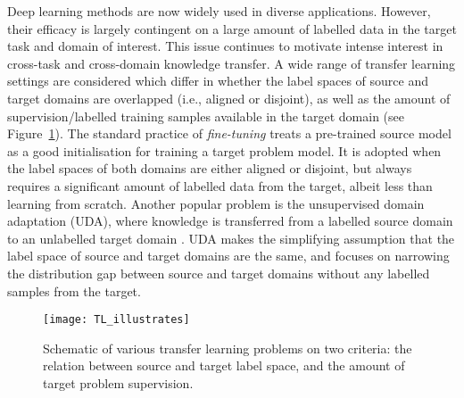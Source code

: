 \documentclass[letterpaper]{article} \usepackage{aaai19}  \usepackage{times}  \usepackage{helvet}  \usepackage{courier}  \usepackage{url}  \usepackage{graphicx}
\begin{document}
Deep learning methods are now widely used in diverse applications. However, their efficacy is largely contingent on a large amount of labelled data in the target task and domain of interest. This issue continues to motivate intense interest in cross-task and cross-domain knowledge transfer. A wide range of transfer learning settings are considered which differ in whether the label spaces of source and target domains are overlapped (i.e., aligned or disjoint), as well as the amount of supervision/labelled training samples available in the target domain (see Figure~\ref{fig:tl_illustrate}). The standard practice of \emph{fine-tuning} \cite{yosinski2014transferable} treats a pre-trained source model  as a good initialisation for training a target problem model. It is adopted when the label spaces of both domains are either aligned or disjoint, but always requires a significant amount of labelled data from the target, albeit less than learning from scratch. 
Another popular problem is the unsupervised domain adaptation (UDA), where knowledge is transferred from a labelled source domain to an unlabelled target domain \cite{adversarial_feat_cvpr17,ganin2016domain,cao2018unsupervised}. UDA makes the simplifying assumption that the label space of source and target domains are the same, and focuses on narrowing the distribution gap between source and target domains without any labelled samples from the target.

\begin{figure}[t]
\centering
\texttt{[image: TL\_illustrates]}
\caption{Schematic of various transfer learning problems on two criteria: the relation between source and target label space, and the amount of target problem supervision.}
\label{fig:tl_illustrate}
\end{figure}
\end{document}
